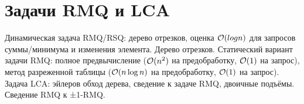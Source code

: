 \section{Задачи RMQ и LCA}
Динамическая задача RMQ/RSQ:
дерево отрезков, оценка $\mathcal{O}(log n)$
для запросов суммы/минимума
и изменения элемента.
Дерево отрезков.
Статический вариант задачи RMQ:
полное предвычисление
($\mathcal{O}(n^2)$ на предобработку, $\mathcal{O}(1)$ на запрос),
метод разреженной таблицы
($\mathcal{O}(n \log n)$ на предобработку, $\mathcal{O}(1)$ на запрос).
Задача LCA: эйлеров обход дерева,
сведение к задаче RMQ, двоичные подъёмы.
Сведение RMQ к ±1-RMQ.
